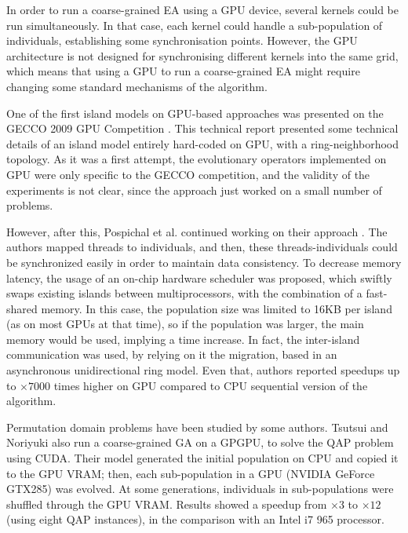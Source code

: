 \documentclass{article}
\begin{document}
In order to run a coarse-grained EA using a GPU device, several kernels could be run simultaneously. In that case, each kernel could handle a sub-population of individuals, establishing some synchronisation points.
However, the GPU architecture is not designed for synchronising
different kernels into the same grid, which means that using a GPU to
run a coarse-grained EA might require changing some standard mechanisms
of the algorithm.


One of the first island models on GPU-based approaches was presented on the GECCO 2009 GPU Competition \cite{gecco2009CompetitionPospichal}. This technical report presented some technical details of an island model entirely hard-coded on GPU, with a ring-neighborhood topology. As it was a first attempt, the evolutionary operators implemented on GPU were only specific to the GECCO competition, and the validity of the experiments is not clear, since the approach just worked on a small number of problems.

However, after this, Pospichal et al. continued working on their approach \cite{pospichalParallelGeneticAlgorithOnCUDA2010,9253}. The authors mapped threads to individuals, and then, these threads-individuals could be synchronized easily in order to maintain data consistency. To decrease memory latency, the usage of an on-chip hardware scheduler was proposed, which swiftly swaps existing islands between multiprocessors, with the combination of a fast-shared memory. In this case, the population size was limited to 16KB per island (as on most GPUs at that time), so if the population was larger, the main memory would be used, implying a time increase. In fact, the inter-island communication was used, by relying on it the migration, based in an asynchronous unidirectional ring model. Even that, authors reported speedups up to $\times7000$ times higher on GPU compared to CPU sequential version of the algorithm.

Permutation domain problems have been studied by some authors. Tsutsui and Noriyuki \cite{1570355} also run a coarse-grained GA on a GPGPU, to solve the QAP problem using CUDA. Their model generated the initial population on CPU and copied it to the GPU VRAM; then, each sub-population in a GPU (NVIDIA GeForce GTX285) was evolved. At some generations, individuals in sub-populations were shuffled through the GPU VRAM. Results showed a speedup from $\times3$ to $\times12$ (using eight QAP instances), in the comparison with an Intel i7 965 processor.
\end{document}
